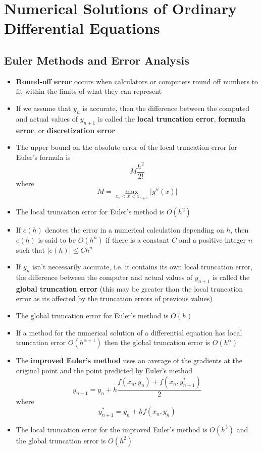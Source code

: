 \documentclass{article}
\begin{document}
\section{Numerical Solutions of Ordinary Differential Equations}

\subsection{Euler Methods and Error Analysis}

\begin{itemize}
  \item \textbf{Round-off error} occurs when calculators or computers round off numbers to fit within the limits of what they can represent

  \item If we assume that $y_n$ is accurate, then the difference between the computed and actual values of $y_{n + 1}$ is called the \textbf{local truncation error}, \textbf{formula error}, or \textbf{discretization error}

  \item The upper bound on the absolute error of the local truncation error for Euler's formula is \[M \frac{h^2}{2!}\] where \[M = \max_{x_n < x < x_{n + 1}} |y''(x)|\]

  \item The local truncation error for Euler's method is $O(h^2)$

  \item If $e(h)$ denotes the error in a numerical calculation depending on $h$, then $e(h)$ is said to be $O(h^n)$ if there is a constant $C$ and a positive integer $n$ such that $|e(h)| \le C h^n$

  \item If $y_n$ isn't necessarily accurate, i.e. it contains its own local truncation error, the difference between the computer and actual values of $y_{n + 1}$ is called the \textbf{global truncation error} (this may be greater than the local truncation error as its affected by the truncation errors of previous values)

  \item The global truncation error for Euler's method is $O(h)$

  \item If a method for the numerical solution of a differential equation has local truncation error $O(h^{\alpha + 1})$ then the global truncation error is $O(h^\alpha)$

  \item The \textbf{improved Euler's method} uses an average of the gradients at the original point and the point predicted by Euler's method \[y_{n + 1} = y_n + h \frac{f(x_n, y_n) + f(x_n, y^*_{n + 1})}{2}\] where \[y^*_{n + 1} = y_n + h f(x_n, y_n)\]

  \item The local truncation error for the improved Euler's method is $O(h^3)$ and the global truncation error is $O(h^2)$
\end{itemize}
\end{document}
